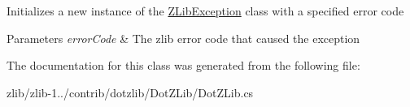 Initializes a new instance of the \hyperlink{class_dot_z_lib_1_1_z_lib_exception}{Z\+Lib\+Exception} class with a specified error code 


\begin{DoxyParams}{Parameters}
{\em error\+Code} & The zlib error code that caused the exception\\
\hline
\end{DoxyParams}


The documentation for this class was generated from the following file\+:\begin{DoxyCompactItemize}
\item 
zlib/zlib-\/1../contrib/dotzlib/\+Dot\+Z\+Lib/Dot\+Z\+Lib.\+cs\end{DoxyCompactItemize}
